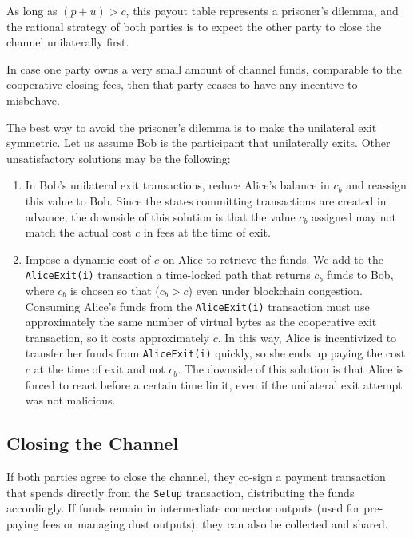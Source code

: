 \documentclass[11pt,a4paper]{article}
\newcommand{\txname}[1]{\texttt{#1}}
\begin{document}
As long as $(p+u) > c$, this payout table represents a prisoner's dilemma, and the rational strategy of both parties is to expect the other party to close the channel unilaterally first.

In case one party owns a very small amount of channel funds, comparable to the cooperative closing fees, then that party ceases to have any incentive to misbehave.

The best way to avoid the prisoner's dilemma is to make the unilateral exit symmetric.
Let us assume Bob is the participant that unilaterally exits. Other unsatisfactory solutions may be the following:
\begin{enumerate}

    \item In Bob's unilateral exit transactions, reduce Alice's balance in $c_b$ and reassign this value to Bob. Since the states committing transactions are created in advance, the downside of this solution is that the value $c_b$ assigned may not match the actual cost $c$ in fees at the time of exit.
    
    \item Impose a dynamic cost of $c$ on Alice to retrieve the funds.  We add to the \txname{AliceExit(i)} transaction a time-locked path that returns $c_b$ funds to Bob, where $c_b$ is chosen so that ($c_b > c$) even under blockchain congestion. Consuming Alice’s funds from the \txname{AliceExit(i)} transaction must use approximately the same number of virtual bytes as the cooperative exit transaction, so it costs approximately $c$. In this way, Alice is incentivized to transfer her funds from \txname{AliceExit(i)} quickly, so she ends up paying the cost $c$ at the time of exit and not $c_b$. The downside of this solution is that Alice is forced to react before a certain time limit, even if the unilateral exit attempt was not malicious. 
\end{enumerate}



\subsection{Closing the Channel}
\label{closing}

If both parties agree to close the channel, they co-sign a payment transaction that spends directly from the \txname{Setup} transaction, distributing the funds accordingly. If funds remain in intermediate connector outputs (used for pre-paying fees or managing dust outputs), they can also be collected and shared.
\end{document}
